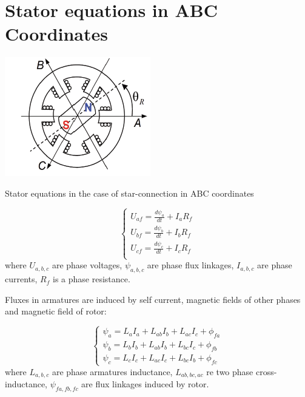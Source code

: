 \documentclass[11pt,a4paper,oneside]{report}
\begin{document}
\section{Stator equations in ABC Coordinates}

\begin{center}
	\includegraphics[scale=1]{bldc}
\end{center}

Stator equations in the case of star-connection in ABC coordinates

\begin{equation}
	\left\{
	\begin{split}
		U_{af} = \frac{d\psi_a}{dt}+I_aR_f\\
		U_{bf} = \frac{d\psi_b}{dt}+I_bR_f\\
		U_{cf} = \frac{d\psi_c}{dt}+I_cR_f\\
	\end{split}
	\right.
\end{equation}
where $U_{a,b,c}$ are phase voltages, $\psi_{a,b,c}$ are phase flux linkages, $I_{a,b,c}$ are phase currents, $R_f$ is a phase resistance.

Fluxes in armatures are induced by self current, magnetic fields of other phases and magnetic field of rotor:

 \begin{equation}
 	\left\{
 	\begin{split}
 		\psi_a = L_aI_a+L_{ab}I_b+L_{ac}I_c+\phi_{fa}\\
 		\psi_b = L_bI_b+L_{ab}I_b+L_{bc}I_c+\phi_{fb}\\
 		\psi_c = L_cI_c+L_{ac}I_c+L_{bc}I_b+\phi_{fc}
 	\end{split}
 	\right.
 \end{equation}
where $L_{a,b,c}$ are phase armatures inductance, $L_{ab,bc,ac}$ re two phase cross-inductance, $\psi_{fa,fb,fc}$ are flux linkages induced by rotor.
\end{document}
